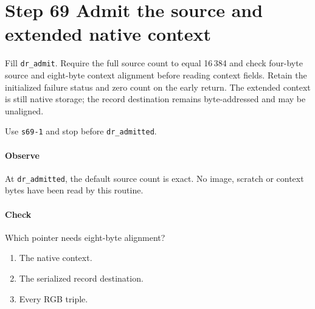 \section{Step 69 Admit the source and extended native context}
Fill \texttt{dr\_admit}. Require the full source count to equal 16\,384 and check four-byte source and eight-byte context alignment before reading context fields. Retain the initialized failure status and zero count on the early return. The extended context is still native storage; the record destination remains byte-addressed and may be unaligned.

Use \texttt{s69-1} and stop before \texttt{dr\_admitted}.

\paragraph{Observe} At \texttt{dr\_admitted}, the default source count is exact. No image, scratch or context bytes have been read by this routine.

\paragraph{Check} Which pointer needs eight-byte alignment?
\begin{enumerate}[label=\Alph*.]
  \item The native context.
  \item The serialized record destination.
  \item Every RGB triple.
\end{enumerate}
